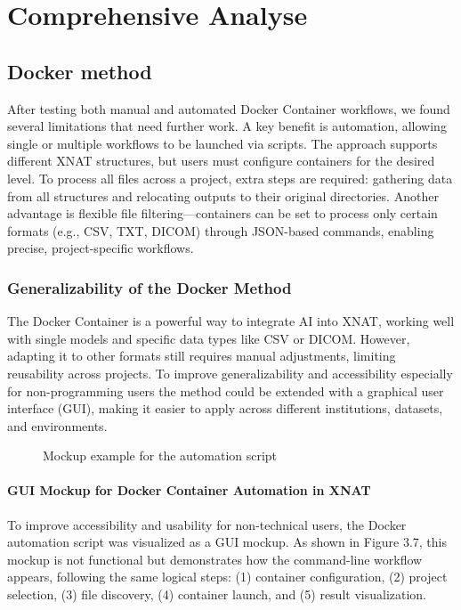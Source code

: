 \chapter{Comprehensive Analyse}
\section{Docker method}

After testing both manual and automated Docker Container workflows, we found several limitations that need further work. A key benefit is automation, allowing single or multiple workflows to be launched via scripts. The approach supports different XNAT structures, but users must configure containers for the desired level. To process all files across a project, extra steps are required: gathering data from all structures and relocating outputs to their original directories. Another advantage is flexible file filtering—containers can be set to process only certain formats (e.g., CSV, TXT, DICOM) through JSON-based commands, enabling precise, project-specific workflows.

\subsection{Generalizability of the Docker Method}
The Docker Container is a powerful way to integrate AI into XNAT, working well with single models and specific data types like CSV or DICOM. However, adapting it to other formats still requires manual adjustments, limiting reusability across projects. To improve generalizability and accessibility especially for non-programming users the method could be extended with a graphical user interface (GUI), making it easier to apply across different institutions, datasets, and environments. 
\begin{figure}[H]
    \centering
    \def\svgwidth{\linewidth} 
    
    \caption{Mockup example for the automation script}
    \label{fig:workflowxnat}
\end{figure}

\subsubsection{GUI Mockup for Docker Container Automation in XNAT}

To improve accessibility and usability for non-technical users, the Docker automation script was visualized as a GUI mockup. As shown in Figure 3.7, this mockup is not functional but demonstrates how the command-line workflow appears, following the same logical steps: (1) container configuration, (2) project selection, (3) file discovery, (4) container launch, and (5) result visualization.
